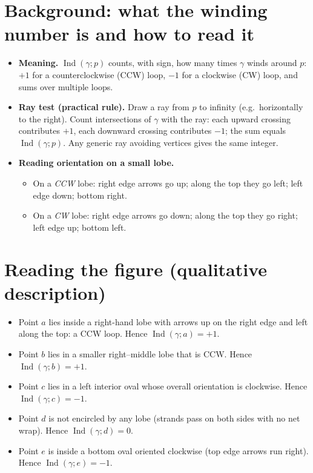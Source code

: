 \documentclass[11pt]{article}
\DeclareMathOperator{\Ind}{Ind}
\begin{document}
\section*{Background: what the winding number is and how to read it}
\begin{itemize}
	\item \textbf{Meaning.} $\Ind(\gamma;p)$ counts, with sign, how many times $\gamma$
	winds around $p$: $+1$ for a counterclockwise (CCW) loop, $-1$ for a clockwise (CW) loop,
	and sums over multiple loops.
	\item \textbf{Ray test (practical rule).} Draw a ray from $p$ to infinity (e.g.\ horizontally to the right).
	Count intersections of $\gamma$ with the ray:
	each upward crossing contributes $+1$, each downward crossing contributes $-1$;
	the sum equals $\Ind(\gamma;p)$. Any generic ray avoiding vertices gives the same integer.
	\item \textbf{Reading orientation on a small lobe.}
	\begin{itemize}
		\item On a \emph{CCW} lobe: right edge arrows go up; along the top they go left; left edge down; bottom right.
		\item On a \emph{CW} lobe: right edge arrows go down; along the top they go right; left edge up; bottom left.
	\end{itemize}
\end{itemize}

\section*{Reading the figure (qualitative description)}
\begin{itemize}
	\item Point $a$ lies inside a right-hand lobe with arrows up on the right edge and left along the top:
	a CCW loop. Hence $\Ind(\gamma;a)=+1$.
	\item Point $b$ lies in a smaller right–middle lobe that is CCW. Hence $\Ind(\gamma;b)=+1$.
	\item Point $c$ lies in a left interior oval whose overall orientation is clockwise. Hence $\Ind(\gamma;c)=-1$.
	\item Point $d$ is not encircled by any lobe (strands pass on both sides with no net wrap). Hence $\Ind(\gamma;d)=0$.
	\item Point $e$ is inside a bottom oval oriented clockwise (top edge arrows run right). Hence $\Ind(\gamma;e)=-1$.
\end{itemize}
\end{document}
